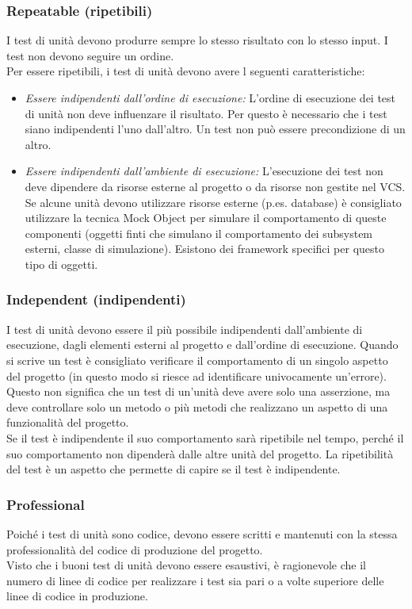 \documentclass[10pt, a4paper]{article}
\begin{document}
\subsubsection*{Repeatable (ripetibili)}
I test di unità devono produrre sempre lo stesso risultato con lo stesso input. I test non devono seguire un ordine.\\
Per essere ripetibili, i test di unità devono avere l seguenti caratteristiche:
\begin{itemize}
\item \textit{Essere indipendenti dall’ordine di esecuzione:} L’ordine di esecuzione dei test di
unità non deve influenzare il risultato. Per questo è necessario che i test siano
indipendenti l'uno dall'altro. Un test non può essere precondizione di un altro.
\item \textit{Essere indipendenti dall’ambiente di esecuzione:} L’esecuzione dei test non deve dipendere da risorse esterne al progetto o da risorse non gestite nel VCS. Se alcune unità devono utilizzare risorse esterne (p.es. database) è consigliato utilizzare la tecnica Mock Object per simulare il comportamento di queste componenti (oggetti finti che simulano il comportamento dei subsystem esterni, classe di simulazione). Esistono dei framework specifici per questo tipo di oggetti.
\end{itemize}

\subsubsection*{Independent (indipendenti)}
I test di unità devono essere il più possibile indipendenti dall'ambiente di esecuzione,
dagli elementi esterni al progetto e dall'ordine di esecuzione. Quando si scrive un
test è consigliato verificare il comportamento di un singolo aspetto del progetto (in
questo modo si riesce ad identificare univocamente un'errore). Questo non significa che
un test di un'unità deve avere solo una asserzione, ma deve controllare solo un metodo
o più metodi che realizzano un aspetto di una funzionalità del progetto.\\
Se il test è indipendente il suo comportamento sarà ripetibile nel tempo, perché il suo
comportamento non dipenderà dalle altre unità del progetto. La ripetibilità del test è un
aspetto che permette di capire se il test è indipendente.

\subsubsection*{Professional}
Poiché i test di unità sono codice, devono essere scritti e mantenuti con la stessa
professionalità del codice di produzione del progetto.\\
Visto che i buoni test di unità devono essere esaustivi, è ragionevole che il numero di
linee di codice per realizzare i test sia pari o a volte superiore delle linee di codice in
produzione.
\end{document}
